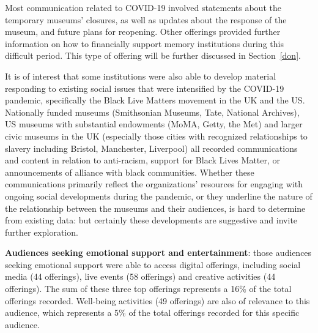 \documentclass{egpubl}
\begin{document}
Most communication related to COVID-19 involved statements about the temporary museums' closures, as well as updates about the response of the museum, and future plans for reopening. Other offerings provided further information on how to financially support memory institutions during this difficult period. This type of offering will be further discussed in Section~\ref{don}.

It is of interest that some institutions were also able to develop material responding to existing social issues that were intensified by the COVID-19 pandemic, specifically the Black Live Matters movement in the UK and the US. Nationally funded museums (Smithsonian Museums, Tate, National Archives), US museums with substantial endowments (MoMA, Getty, the Met) and larger civic museums in the UK (especially those cities with recognized relationships to slavery including Bristol, Manchester, Liverpool) all recorded communications and content in relation to anti-racism, support for Black Lives Matter, or announcements of alliance with black communities. Whether these communications primarily reflect the organizations' resources for engaging with ongoing social developments during the pandemic, or they underline the nature of the relationship between the museums and their audiences, is hard to determine from existing data: but certainly these developments are suggestive and invite further exploration. 
 
\noindent \textbf{Audiences seeking emotional support and entertainment}: those audiences seeking emotional support were able to access digital offerings, including social media (44 offerings), live events (58 offerings) and creative activities (44 offerings). The sum of these three top offerings represents a 16\% of the total offerings recorded. Well-being activities (49 offerings) are also of relevance to this audience, which represents a 5\% of the total offerings recorded for this specific audience. 
\end{document}
